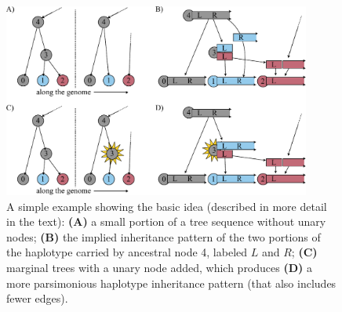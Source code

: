 \documentclass[10pt,twoside,lineno]{gsajnl}
\newcommand{\T}{\mathbb{T}}
\newcommand{\comment}[1]{{\color{violet} \it #1}}
\begin{document}
\begin{figure}
    \begin{center}
    \includegraphics[width=0.9\textwidth]{conceptual_figure.pdf}
    \end{center}
    \caption{
        A simple example showing the basic idea
        (described in more detail in the text):
        \textbf{(A)} a small portion of a tree sequence without unary nodes;
        \textbf{(B)} the implied inheritance pattern of the two portions of the haplotype carried by ancestral node 4,
        labeled $L$ and $R$;
        \textbf{(C)} marginal trees with a unary node added,
        which produces \textbf{(D)} a more parsimonious haplotype inheritance pattern
        (that also includes fewer edges).
        \label{fig:conceptual}
    }
\end{figure}

\end{document}
